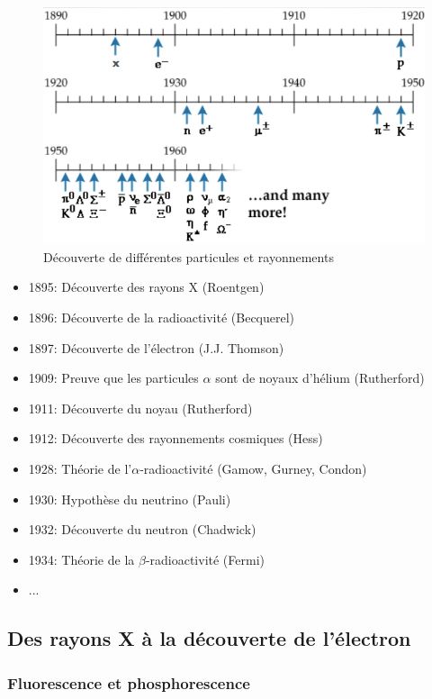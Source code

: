 \begin{figure}[ht]
    \centering
    \includegraphics[scale=0.50]{Images1/ldt.png}
    \caption{Découverte de différentes particules et rayonnements}
    \label{fig:decouvertes}
\end{figure}

\begin{itemize}
    \item 1895: Découverte des rayons X (Roentgen)
    \item 1896: Découverte de la radioactivité (Becquerel)
    \item 1897: Découverte de l'électron (J.J. Thomson)
    \item 1909: Preuve que les particules $\alpha$ sont de noyaux d'hélium (Rutherford)
    \item 1911: Découverte du noyau (Rutherford)
    \item 1912: Découverte des rayonnements cosmiques (Hess)
    \item 1928: Théorie de l'$\alpha$-radioactivité (Gamow, Gurney, Condon)
    \item 1930: Hypothèse du neutrino (Pauli)
    \item 1932: Découverte du neutron (Chadwick)
    \item 1934: Théorie de la $\beta$-radioactivité (Fermi)
    \item ...
\end{itemize}


\subsection{Des rayons X à la découverte de l'électron}
\subsubsection{Fluorescence et phosphorescence}

